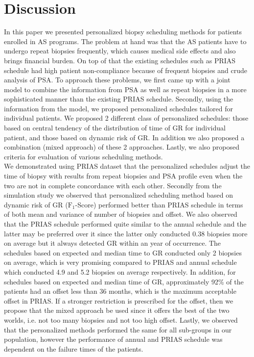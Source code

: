 
\section{Discussion}
\label{sec: discussion}
In this paper we presented personalized biopsy scheduling methods for patients enrolled in AS programs. The problem at hand was that the AS patients have to undergo repeat biopsies frequently, which causes medical side effects and also brings financial burden. On top of that the existing schedules such as PRIAS schedule had high patient non-compliance because of frequent biopsies and crude analysis of PSA. To approach these problems, we first came up with a joint model to combine the information from PSA as well as repeat biopsies in a more sophisticated manner than the existing PRIAS schedule. Secondly, using the information from the model, we proposed personalized schedules tailored for individual patients. We proposed 2 different class of personalized schedules: those based on central tendency of the distribution of time of GR for individual patient, and those based on dynamic risk of GR. In addition we also proposed a combination (mixed approach) of these 2 approaches. Lastly, we also proposed criteria for evaluation of various scheduling methods.\\

We demonstrated using PRIAS dataset that the personalized schedules adjust the time of biopsy with results from repeat biopsies and PSA profile even when the two are not in complete concordance with each other. Secondly from the simulation study we observed that personalized scheduling method based on dynamic risk of GR ($\text{F}_1$-Score) performed better than PRIAS schedule in terms of both mean and variance of number of biopsies and offset. We also observed that the PRIAS schedule performed quite similar to the annual schedule and the latter may be preferred over it since the latter only conducted 0.38 biopsies more on average but it always detected GR within an year of occurrence. The schedules based on expected and median time to GR conducted only 2 biopsies on average, which is very promising compared to PRIAS and annual schedule which conducted 4.9 and 5.2 biopsies on average respectively. In addition, for schedules based on expected and median time of GR, approximately 92\% of the patients had an offset less than 36 months, which is the maximum acceptable offset in PRIAS. If a stronger restriction is prescribed for the offset, then we propose that the mixed approach be used since it offers the best of the two worlds, i.e. not too many biopsies and not too high offset. Lastly, we observed that the personalized methods performed the same for all sub-groups in our population, however the performance of annual and PRIAS schedule was dependent on the failure times of the patients.\\

